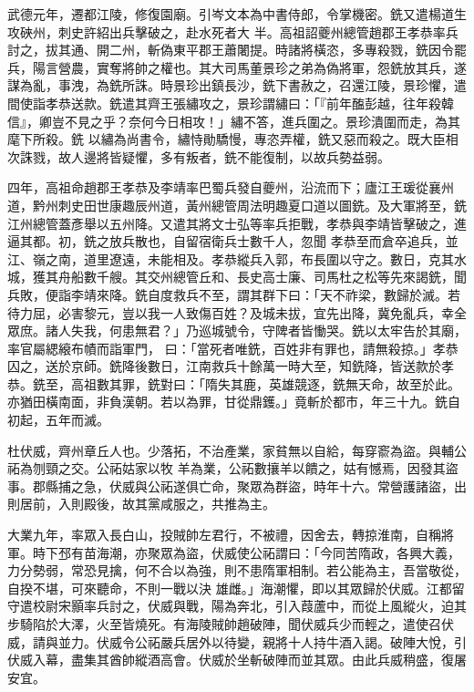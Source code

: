 \begin{pinyinscope}
 武德元年，遷都江陵，修復園廟。引岑文本為中書侍郎，令掌機密。銑又遣楊道生攻硤州，刺史許紹出兵擊破之，赴水死者大
 半。高祖詔夔州總管趙郡王孝恭率兵討之，拔其通、開二州，斬偽東平郡王蕭闍提。時諸將橫恣，多專殺戮，銑因令罷兵，陽言營農，實奪將帥之權也。其大司馬董景珍之弟為偽將軍，怨銑放其兵，遂謀為亂，事洩，為銑所誅。時景珍出鎮長沙，銑下書赦之，召還江陵，景珍懼，遣間使詣孝恭送款。銑遣其齊王張繡攻之，景珍謂繡曰：「『前年醢彭越，往年殺韓信』，卿豈不見之乎？奈何今日相攻！」繡不答，進兵圍之。景珍潰圍而走，為其麾下所殺。銑
 以繡為尚書令，繡恃勛驕慢，專恣弄權，銑又惡而殺之。既大臣相次誅戮，故人邊將皆疑懼，多有叛者，銑不能復制，以故兵勢益弱。



 四年，高祖命趙郡王孝恭及李靖率巴蜀兵發自夔州，沿流而下；廬江王瑗從襄州道，黔州刺史田世康趣辰州道，黃州總管周法明趣夏口道以圖銑。及大軍將至，銑江州總管蓋彥舉以五州降。又遣其將文士弘等率兵拒戰，孝恭與李靖皆擊破之，進逼其都。初，銑之放兵散也，自留宿衛兵士數千人，忽聞
 孝恭至而倉卒追兵，並江、嶺之南，道里遼遠，未能相及。孝恭縱兵入郭，布長圍以守之。數日，克其水城，獲其舟船數千艘。其交州總管丘和、長史高士廉、司馬杜之松等先來謁銑，聞兵敗，便詣李靖來降。銑自度救兵不至，謂其群下曰：「天不祚梁，數歸於滅。若待力屈，必害黎元，豈以我一人致傷百姓？及城未拔，宜先出降，冀免亂兵，幸全眾庶。諸人失我，何患無君？」乃巡城號令，守陴者皆慟哭。銑以太牢告於其廟，率官屬緦縗布幘而詣軍門，
 曰：「當死者唯銑，百姓非有罪也，請無殺掠。」孝恭囚之，送於京師。銑降後數日，江南救兵十餘萬一時大至，知銑降，皆送款於孝恭。銑至，高祖數其罪，銑對曰：「隋失其鹿，英雄競逐，銑無天命，故至於此。亦猶田橫南面，非負漢朝。若以為罪，甘從鼎鑊。」竟斬於都市，年三十九。銑自初起，五年而滅。



 杜伏威，齊州章丘人也。少落拓，不治產業，家貧無以自給，每穿窬為盜。與輔公祏為刎頸之交。公祏姑家以牧
 羊為業，公祏數攘羊以饋之，姑有憾焉，因發其盜事。郡縣捕之急，伏威與公祏遂俱亡命，聚眾為群盜，時年十六。常營護諸盜，出則居前，入則殿後，故其黨咸服之，共推為主。



 大業九年，率眾入長白山，投賊帥左君行，不被禮，因舍去，轉掠淮南，自稱將軍。時下邳有苗海潮，亦聚眾為盜，伏威使公祏謂曰：「今同苦隋政，各興大義，力分勢弱，常恐見擒，何不合以為強，則不患隋軍相制。若公能為主，吾當敬從，自揆不堪，可來聽命，不則一戰以決
 雄雌。」海潮懼，即以其眾歸於伏威。江都留守遣校尉宋顥率兵討之，伏威與戰，陽為奔北，引入葭蘆中，而從上風縱火，迫其步騎陷於大澤，火至皆燒死。有海陵賊帥趙破陣，聞伏威兵少而輕之，遣使召伏威，請與並力。伏威令公祏嚴兵居外以待變，親將十人持牛酒入謁。破陣大悅，引伏威入幕，盡集其酋帥縱酒高會。伏威於坐斬破陣而並其眾。由此兵威稍盛，復屠安宜。




\end{pinyinscope}
